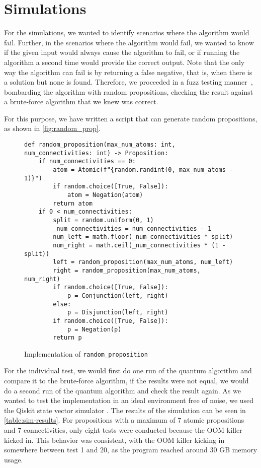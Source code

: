 \section{Simulations}\label{sec:simulations}

For the simulations, we wanted to identify scenarios where the algorithm would fail.
Further, in the scenarios where the algorithm would fail, we wanted to know if the given input would always cause the algorithm to fail, or if running the algorithm a second time would provide the correct output.
Note that the only way the algorithm can fail is by returning a false negative, that is, when there is a solution but none is found.
Therefore, we proceeded in a fuzz testing manner~\cite{miller1990empirical}, bombarding the algorithm with random propositions, checking the result against a brute-force algorithm that we knew was correct.

For this purpose, we have written a script that can generate random propositions, as shown in \autoref{fig:random_prop}.

\begin{figure}[H]
\centering
\begin{verbatim}
def random_proposition(max_num_atoms: int, num_connectivities: int) -> Proposition:
    if num_connectivities == 0:
        atom = Atomic(f"{random.randint(0, max_num_atoms - 1)}")
        if random.choice([True, False]):
            atom = Negation(atom)
        return atom
    if 0 < num_connectivities:
        split = random.uniform(0, 1)
        _num_connectivities = num_connectivities - 1
        num_left = math.floor(_num_connectivities * split)
        num_right = math.ceil(_num_connectivities * (1 - split))
        left = random_proposition(max_num_atoms, num_left)
        right = random_proposition(max_num_atoms, num_right)
        if random.choice([True, False]):
            p = Conjunction(left, right)
        else:
            p = Disjunction(left, right)
        if random.choice([True, False]):
            p = Negation(p)
        return p
\end{verbatim}
\caption{Implementation of \texttt{random\_proposition} }
\label{fig:random_prop}
\end{figure}

For the individual test, we would first do one run of the quantum algorithm and compare it to the brute-force algorithm, if the results were not equal, we would do a second run of the quantum algorithm and check the result again.
As we wanted to test the implementation in an ideal environment free of noise, we used the Qiskit state vector simulator \cite{Statevec72:online}.
The results of the simulation can be seen in \autoref{table:sim-results}.
For propositions with a maximum of 7 atomic propositions and 7 connectivities, only eight tests were conducted because the OOM killer kicked in.
This behavior was consistent, with the OOM killer kicking in somewhere between test 1 and 20, as the program reached around 30 GB memory usage.

